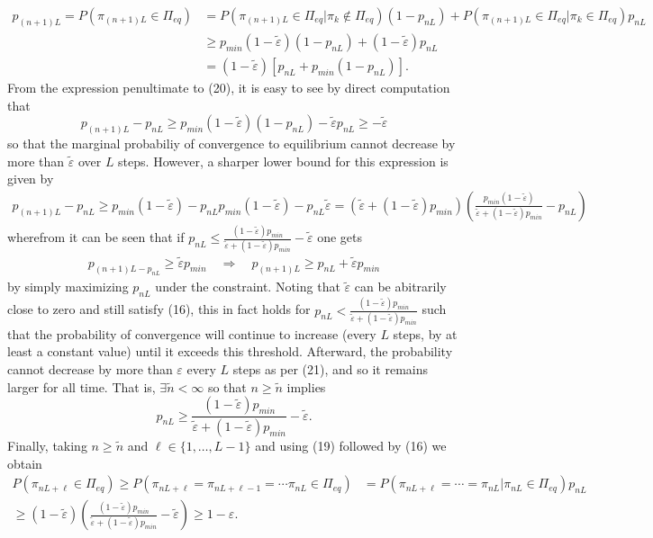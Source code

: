 \documentclass[10pt]{article}
\newcommand{\bp}[1]{\left({#1}\right)}
\newcommand{\1}[1]{\mathbbm{1}_{#1}}
\begin{document}
\begin{align*}
    p_{(n+1)L}=P(\pi_{(n+1)L}\in\Pi_{eq})&=P(\pi_{(n+1)L}\in\Pi_{eq}|\pi_k\notin\Pi_{eq})(1-p_{nL})+P(\pi_{(n+1)L}\in\Pi_{eq}|\pi_k\in\Pi_{eq})p_{nL}\\
    &\geq p_{min}(1-\tilde{\varepsilon})(1-p_{nL})+(1-\tilde{\varepsilon})p_{nL}\\
    &=(1-\tilde{\varepsilon})[p_{nL}+p_{min}(1-p_{nL})].\tag{20}
\end{align*}
From the expression penultimate to (20), it is easy to see by direct computation that
\[p_{(n+1)L}-p_{nL}\geq p_{min}(1-\tilde{\varepsilon})(1-p_{nL})-\tilde{\varepsilon}p_{nL}\geq -\tilde{\varepsilon}\tag{21}\]
so that the marginal probabiliy of convergence to equilibrium cannot decrease by more than $\tilde{\varepsilon}$ over $L$ steps. However, a sharper lower bound for this expression is given by
\begin{align*}
    p_{(n+1)L}-p_{nL}\geq p_{min}(1-\tilde{\varepsilon})-p_{nL}p_{min}(1-\tilde{\varepsilon})-p_{nL}\tilde{\varepsilon}=(\tilde{\varepsilon}+(1-\tilde{\varepsilon})p_{min})\bp{\frac{p_{min}(1-\tilde{\varepsilon})}{\tilde{\varepsilon}+(1-\tilde{\varepsilon})p_{min}}-p_{nL}}\tag{22}
\end{align*}
wherefrom it can be seen that if $p_{nL}\leq\tfrac{(1-\tilde{\varepsilon})p_{min}}{\tilde{\varepsilon}+(1-\tilde{\varepsilon})p_{min}}-\tilde{\varepsilon}$ one gets
\begin{align*}
    p_{(n+1)L-p_{nL}}\geq \tilde{\varepsilon}p_{min}\quad\Rightarrow\quad p_{(n+1)L}\geq p_{nL}+\tilde{\varepsilon}p_{min}\tag{23}
\end{align*}
by simply maximizing $p_{nL}$ under the constraint. Noting that $\tilde{\varepsilon}$ can be abitrarily close to zero and still satisfy (16), this in fact holds for $p_{nL}<\tfrac{(1-\tilde{\varepsilon})p_{min}}{\tilde{\varepsilon}+(1-\tilde{\varepsilon})p_{min}}$ such that the probability of convergence will continue
to increase (every $L$ steps, by at least a constant value) until it exceeds this threshold. Afterward, the probability cannot decrease by more than $\varepsilon$ every $L$ steps as per (21), and so it remains larger for all time. That is, $\exists\tilde{n}<\infty$ so that $n\geq\tilde{n}$ implies
\[p_{nL}\geq\frac{(1-\tilde{\varepsilon})p_{min}}{\tilde{\varepsilon}+(1-\tilde{\varepsilon})p_{min}}-\tilde{\varepsilon}.\]
Finally, taking $n\geq\tilde{n}$ and $\ell\in\{1,\dots,L-1\}$ and using (19) followed by (16) we obtain
\begin{align*}
    P(\pi_{nL+\ell}\in\Pi_{eq})\geq P(\pi_{nL+\ell}=\pi_{nL+\ell-1}=\cdots\pi_{nL}\in\Pi_{eq})&=P(\pi_{nL+\ell}=\cdots=\pi_{nL}|\pi_{nL}\in\Pi_{eq})p_{nL}\\
    \geq(1-\tilde{\varepsilon})\bp{\frac{(1-\tilde{\varepsilon})p_{min}}{\tilde{\varepsilon}+(1-\tilde{\varepsilon})p_{min}}-\tilde{\varepsilon}}\geq 1-\varepsilon.\tag*{$\qed$}
\end{align*}
\end{document}
